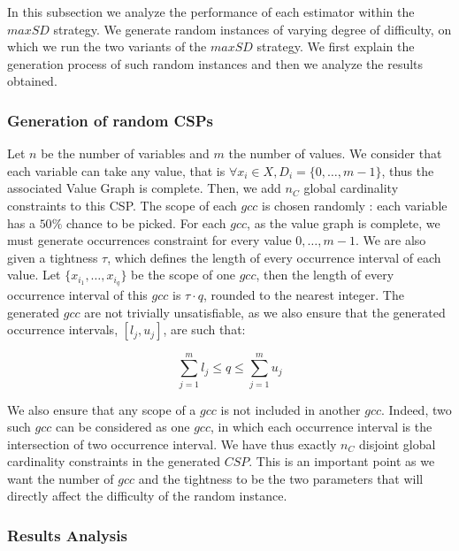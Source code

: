 \documentclass[jair,twoside,11pt,theapa]{article}
\newcommand{\noteGilles}[1]  {{\color{red}{\sc \scriptsize [Gilles: #1]}}}
\begin{document}
In this subsection we analyze the performance of each estimator within the $maxSD$ strategy. We generate random instances of varying degree of difficulty, on which we run the two variants of the $maxSD$ strategy. We first explain the generation process of such random instances and then we analyze the results obtained.

\subsubsection{Generation of random CSPs}

Let $n$ be the number of variables and $m$ the number of values. We consider that each variable can take any value, that is $\forall x_i \in X, D_i = \lbrace 0, \ldots, m-1 \rbrace$, thus the associated Value Graph is complete. Then, we add $n_C$ global cardinality constraints to this CSP. 
\noteGilles{puisque nous avons déjà $n$, $n_C$ ressemble à un produit; choisir une autre notation à une seule lettre}
The scope of each $gcc$ is chosen randomly : each variable has a $50\%$ chance to be picked. For each $gcc$, as the value graph is complete, we must generate occurrences constraint for every value $0, \ldots, m-1$. We are also given a tightness $\tau$, which defines the length of every occurrence interval of each value. Let $\lbrace x_{i_1}, \ldots, x_{i_q}\rbrace$ be the scope of one $gcc$, then the length of every occurrence interval of this $gcc$ is $\tau \cdot q$, rounded to the nearest integer. The generated $gcc$ are not trivially unsatisfiable, as we also ensure that the generated occurrence intervals, $[l_j, u_j]$, are such that:

\begin{equation*}
	\sum_{j=1}^m l_j \leq q \leq \sum_{j=1}^m u_j
\end{equation*}

We also ensure that any scope of a $gcc$ is not included in another $gcc$. Indeed, two such $gcc$ can be considered as one $gcc$, in which each occurrence interval is the intersection of two occurrence interval. We have thus exactly $n_C$ disjoint global cardinality constraints in the generated $CSP$. This is an important point as we want the number of $gcc$ and the tightness to be the two parameters that will directly affect the difficulty of the random instance.



\subsubsection{Results Analysis}
\end{document}
